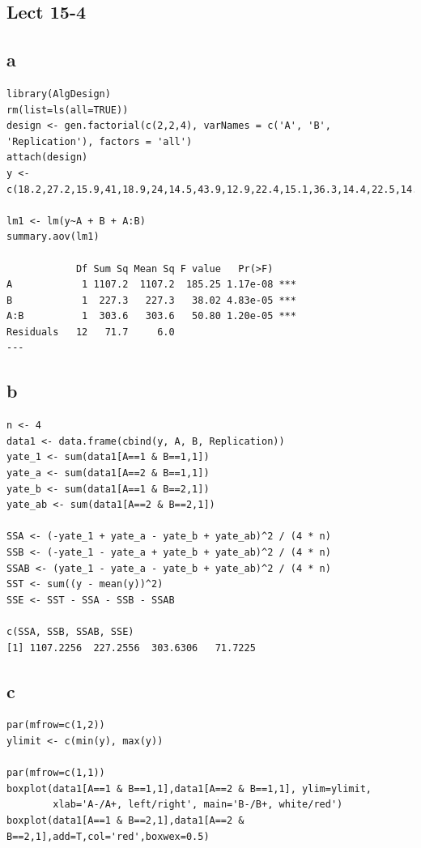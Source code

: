 \documentclass[11pt,letterpaper]{article}
\begin{document}
\subsection*{Lect 15-4}
\subsection*{a}
\begin{verbatim}
library(AlgDesign)
rm(list=ls(all=TRUE))
design <- gen.factorial(c(2,2,4), varNames = c('A', 'B', 'Replication'), factors = 'all')
attach(design)
y <- c(18.2,27.2,15.9,41,18.9,24,14.5,43.9,12.9,22.4,15.1,36.3,14.4,22.5,14.2,39.9)

lm1 <- lm(y~A + B + A:B)
summary.aov(lm1)

            Df Sum Sq Mean Sq F value   Pr(>F)    
A            1 1107.2  1107.2  185.25 1.17e-08 ***
B            1  227.3   227.3   38.02 4.83e-05 ***
A:B          1  303.6   303.6   50.80 1.20e-05 ***
Residuals   12   71.7     6.0                     
---
\end{verbatim}

\subsection*{b}
\begin{verbatim}
n <- 4
data1 <- data.frame(cbind(y, A, B, Replication))
yate_1 <- sum(data1[A==1 & B==1,1])
yate_a <- sum(data1[A==2 & B==1,1])
yate_b <- sum(data1[A==1 & B==2,1])
yate_ab <- sum(data1[A==2 & B==2,1])

SSA <- (-yate_1 + yate_a - yate_b + yate_ab)^2 / (4 * n)
SSB <- (-yate_1 - yate_a + yate_b + yate_ab)^2 / (4 * n)
SSAB <- (yate_1 - yate_a - yate_b + yate_ab)^2 / (4 * n)
SST <- sum((y - mean(y))^2)
SSE <- SST - SSA - SSB - SSAB

c(SSA, SSB, SSAB, SSE)
[1] 1107.2256  227.2556  303.6306   71.7225
\end{verbatim}

\subsection*{c}
\begin{verbatim}
par(mfrow=c(1,2))
ylimit <- c(min(y), max(y))

par(mfrow=c(1,1))
boxplot(data1[A==1 & B==1,1],data1[A==2 & B==1,1], ylim=ylimit, 
        xlab='A-/A+, left/right', main='B-/B+, white/red')
boxplot(data1[A==1 & B==2,1],data1[A==2 & B==2,1],add=T,col='red',boxwex=0.5)
\end{verbatim}
\end{document}
